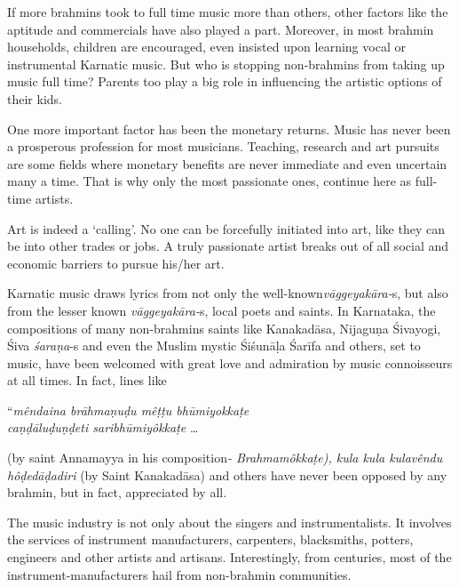 If more brahmins took to full time music more than others, other factors like the aptitude and commercials have also played a part. Moreover, in most brahmin households, children are encouraged, even insisted upon learning vocal or instrumental Karnatic music. But who is stopping non-brahmins from taking up music full time? Parents too play a big role in influencing the artistic options of their kids.

One more important factor has been the monetary returns. Music has never been a prosperous profession for most musicians. Teaching, research and art pursuits are some fields where monetary benefits are never immediate and even uncertain many a time. That is why only the most passionate ones, continue here as full-time artists.

Art is indeed a ‘calling’. No one can be forcefully initiated into art, like they can be into other trades or jobs. A truly passionate artist breaks out of all social and economic barriers to pursue his/her art.

Karnatic music draws lyrics from not only the well-known\break \textit{vāggeyakāra-}s, but also from the lesser known \textit{vāggeyakāra-}s, local poets and saints. In Karnataka, the compositions of many non-brahmins saints like Kanakadāsa, Nijaguṇa Śivayogi, Śiva \textit{śaraṇa}-s and even the Muslim mystic Śiśunāḷa Śarīfa and others, set to music, have been welcomed with great love and admiration by music connoisseurs at all times. In fact, lines like

\begin{centerquote}
“\textit{mêndaina brāhmaṇuḍu mêṭṭu bhūmiyokkaṭe \\ caṇḍāluḍuṇḍeti saribhūmiyôkkaṭe} … 
\end{centerquote}

(by saint Annamayya in his composition\textit{- Brahmamôkkaṭe), kula kula kulavêndu hôḍedāḍadiri} (by Saint Kanakadāsa) and others have never been opposed by any brahmin, but in fact, appreciated by all.

The music industry is not only about the singers and instrumentalists. It involves the services of instrument manufacturers, carpenters, blacksmiths, potters, engineers and other artists and artisans. Interestingly, from centuries, most of the instrument-manufacturers hail from non-brahmin communities.

